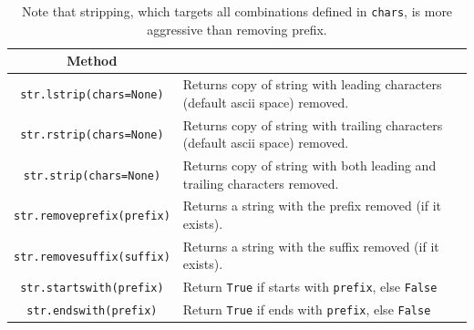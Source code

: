     \begin{definition}
      \label{def:strip-prefix-and-suffix}
 
      \begin{table}[H]
        \centering
        \begin{tabular}{|c|p{10cm}|}
          \hline
          \textbf{Method} & \textbf{} \\
          \hline
          \texttt{str.lstrip(chars=None)} & Returns copy of string with leading characters (default ascii space) removed. \\
          \texttt{str.rstrip(chars=None)} & Returns copy of string with trailing characters (default ascii space) removed. \\
          \texttt{str.strip(chars=None)} & Returns copy of string with both leading and trailing characters removed. \\
          \texttt{str.removeprefix(prefix)} & Returns a string with the prefix removed (if it exists). \\
          \texttt{str.removesuffix(suffix)} & Returns a string with the suffix removed (if it exists). \\ 
          \texttt{str.startswith(prefix)} & Return \texttt{True} if starts with \texttt{prefix}, else \texttt{False} \\ 
          \texttt{str.endswith(prefix)} & Return \texttt{True} if ends with \texttt{prefix}, else \texttt{False} \\  
          \hline
        \end{tabular}
        \caption{Note that stripping, which targets all combinations defined in \texttt{chars}, is more aggressive than removing prefix. }
      \end{table}
    \end{definition} 

